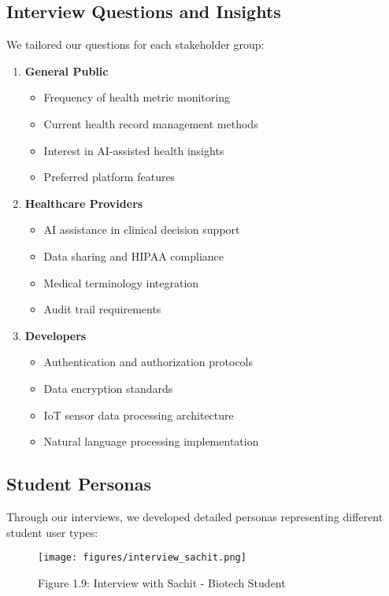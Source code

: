 \subsection{Interview Questions and Insights}
We tailored our questions for each stakeholder group:

\begin{enumerate}
    \item \textbf{General Public}
    \begin{itemize}
        \item Frequency of health metric monitoring
        \item Current health record management methods
        \item Interest in AI-assisted health insights
        \item Preferred platform features
    \end{itemize}

    \item \textbf{Healthcare Providers}
    \begin{itemize}
        \item AI assistance in clinical decision support
        \item Data sharing and HIPAA compliance
        \item Medical terminology integration
        \item Audit trail requirements
    \end{itemize}

    \item \textbf{Developers}
    \begin{itemize}
        \item Authentication and authorization protocols
        \item Data encryption standards
        \item IoT sensor data processing architecture
        \item Natural language processing implementation
    \end{itemize}
\end{enumerate}

\subsection{Student Personas}
Through our interviews, we developed detailed personas representing different student user types:

\begin{figure}[H]
    \centering
    \texttt{[image: figures/interview\_sachit.png]}
    \caption{Figure 1.9: Interview with Sachit - Biotech Student}
\end{figure}

